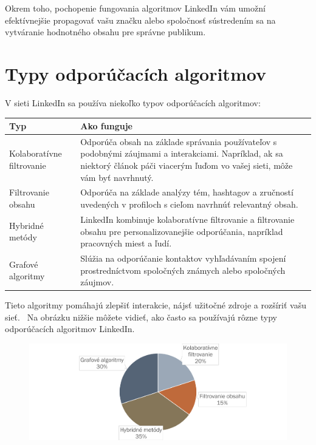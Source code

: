 \documentclass[slovak,a4paper]{coursepaper}
\begin{document}
Okrem toho, pochopenie fungovania algoritmov LinkedIn vám umožní efektívnejšie propagovať vašu značku alebo spoločnosť sústredením sa na vytváranie hodnotného obsahu pre správne publikum.

\newpage
\section{Typy odporúčacích algoritmov} \label{Typy}
V sieti LinkedIn sa používa niekoľko typov odporúčacích algoritmov:


\begin{table}[h!]
    \begin{tabularx}{\textwidth}{|>{\centering\arraybackslash}l|X|}
        \hline
        \textbf{Typ} & \textbf{Ako funguje} 
		\\ \hline Kolaboratívne filtrovanie & Odporúča obsah na základe správania používateľov 
		s podobnými záujmami a interakciami. Napríklad, ak sa niektorý článok páči viacerým ľuďom vo vašej sieti, môže vám byť navrhnutý.

		\\ \hline Filtrovanie obsahu & Odporúča na základe analýzy tém, hashtagov a zručností uvedených v profiloch s cieľom navrhnúť relevantný obsah.  
		\\ \hline Hybridné metódy & LinkedIn kombinuje kolaboratívne filtrovanie a filtrovanie obsahu pre personalizovanejšie odporúčania, napríklad pracovných miest a ľudí.
		\\ \hline Grafové algoritmy & Slúžia na odporúčanie kontaktov vyhľadávaním spojení prostredníctvom spoločných známych alebo spoločných záujmov.
		\\ \hline
    \end{tabularx}
    \label{tab:typy}
\end{table}

Tieto algoritmy pomáhajú zlepšiť interakcie, nájsť užitočné zdroje a rozšíriť vašu sieť.~\cite{3} Na obrázku nižšie môžete vidieť, ako často sa používajú rôzne typy odporúčacích algoritmov LinkedIn.

\begin{figure}[H]
	\hspace*{-3cm}
	\includegraphics[width=1.4\textwidth]{graph.png}
\end{figure}
\end{document}
